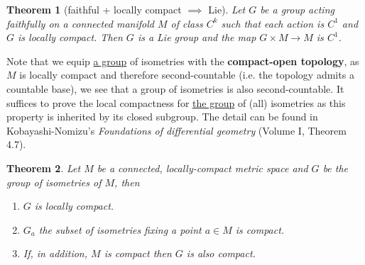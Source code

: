 \documentclass[11pt]{article}
\newtheorem{theorem}{Theorem}
\begin{document}
\begin{theorem}[faithful + locally compact $\implies$ Lie]
\label{org7fefb45}
Let \(G\) be a group acting faithfully on a connected manifold \(M\) of class \(C^k\) such that each
action is \(C^1\) and \(G\) is locally compact. Then \(G\) is a Lie group and the map \(G\times M\longrightarrow M\) is \(C^1\).
\end{theorem}

Note that we equip \uline{a group} of isometries with the \textbf{compact-open topology}, as \(M\) is locally
 compact and therefore second-countable (i.e. the topology admits a countable base), we see that a
 group of isometries is also second-countable. It suffices to prove the local compactness for \uline{the
 group} of (all) isometries as this property is inherited by its closed subgroup. The detail can be
 found in Kobayashi-Nomizu's \emph{Foundations of differential geometry} (Volume I, Theorem 4.7).

\begin{theorem}
\label{org04da794}
Let \(M\) be a connected, locally-compact metric space and \(G\) be the group of isometries of
\(M\), then
\begin{enumerate}
\item \(G\) is locally compact.
\item \(G_a\) the subset of isometries fixing a point \(a\in M\) is compact.
\item If, in addition, \(M\) is compact then \(G\) is also compact.
\end{enumerate}
\end{theorem}
\end{document}
